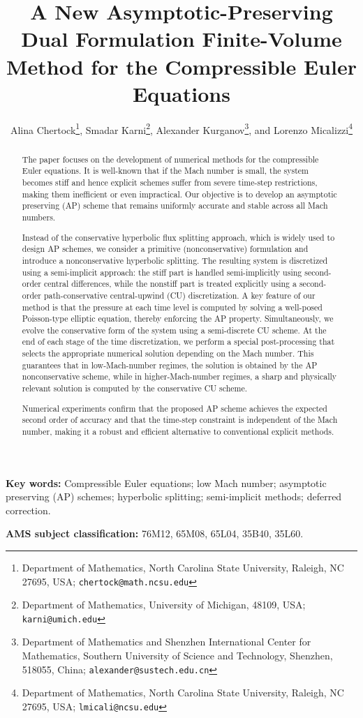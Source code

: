 \documentclass[A4paper,12pt,twoside]{article}
\title{A New Asymptotic-Preserving Dual Formulation Finite-Volume Method for the Compressible Euler Equations}
\author{Alina Chertock\thanks{Department of Mathematics, North Carolina State University, Raleigh, NC 27695, USA;
{\tt chertock@math.ncsu.edu}}, Smadar Karni\thanks{Department of Mathematics, University of Michigan, 48109, USA; {\tt karni@umich.edu}},
Alexander Kurganov\thanks{Department of Mathematics and Shenzhen International Center for Mathematics, Southern University of Science and
Technology, Shenzhen, 518055, China; {\tt alexander@sustech.edu.cn}}, and Lorenzo Micalizzi\thanks{Department of Mathematics, North Carolina
State University, Raleigh, NC 27695, USA; {\tt lmicali@ncsu.edu}}}
\date{}
\numberwithin{equation}{section}
\numberwithin{figure}{section}
\numberwithin{table}{section}
\begin{document}
\maketitle

\begin{abstract}
The paper focuses on the development of numerical methods for the compressible Euler equations. It is well-known that if the Mach number is
small, the system becomes stiff and hence explicit schemes suffer from severe time-step restrictions, making them inefficient or even
impractical. Our objective is to develop an asymptotic preserving (AP) scheme that remains uniformly accurate and stable across all Mach
numbers.

Instead of the conservative hyperbolic flux splitting approach, which is widely used to design AP schemes, we consider a primitive
(nonconservative) formulation and introduce a nonconservative hyperbolic splitting. The resulting system is discretized using a
semi-implicit approach: the stiff part is handled semi-implicitly using second-order central differences, while the nonstiff part is treated
explicitly using a second-order path-conservative central-upwind (CU) discretization. A key feature of our method is that the pressure at
each time level is computed by solving a well-posed Poisson-type elliptic equation, thereby enforcing the AP property. Simultaneously, we
evolve the conservative form of the system using a semi-discrete CU scheme. At the end of each stage of the time discretization, we perform
a special post-processing that selects the appropriate numerical solution depending on the Mach number. This guarantees that in
low-Mach-number regimes, the solution is obtained by the AP nonconservative scheme, while in higher-Mach-number regimes, a sharp and
physically relevant solution is computed by the conservative CU scheme.

Numerical experiments confirm that the proposed AP scheme achieves the expected second order of accuracy and that the time-step constraint
is independent of the Mach number, making it a robust and efficient alternative to conventional explicit methods.
\end{abstract}

\noindent
{\bf Key words:} Compressible Euler equations; low Mach number; asymptotic preserving (AP) schemes; hyperbolic splitting; semi-implicit
methods; deferred correction.

\medskip
\noindent
{\bf AMS subject classification:} 76M12, 65M08, 65L04, 35B40, 35L60.
\end{document}
